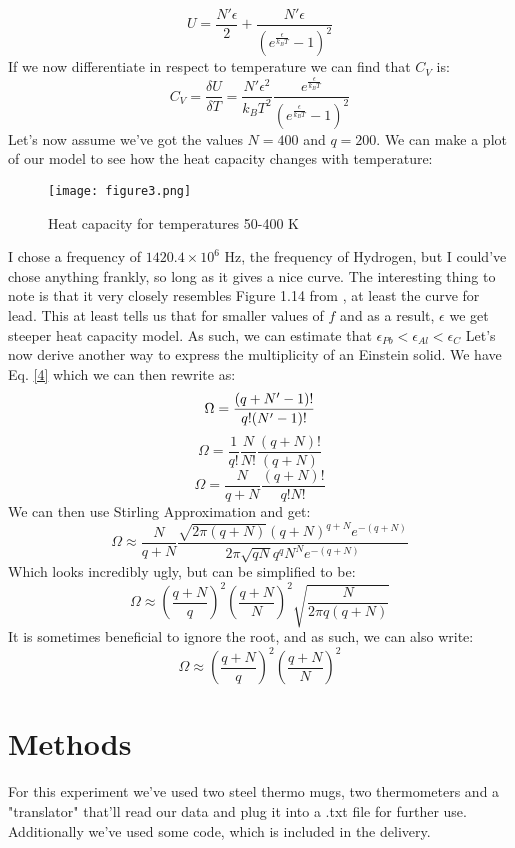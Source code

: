 \documentclass{article}
\begin{document}
\begin{equation}
    U = \frac{N' \epsilon}{2} + \frac{N' \epsilon}{(e^{\frac{\epsilon}{k_BT}}-1)^2}
\end{equation}
If we now differentiate in respect to temperature we can find that $C_V$ is:
\begin{equation}
    C_V = \frac{\delta U}{\delta T} = \frac{N' \epsilon^2}{k_BT^2} \frac{e^{\frac{\epsilon}{k_BT}}}{(e^{\frac{\epsilon}{k_BT}}-1)^2}
\end{equation}
\newpage
Let's now assume we've got the values $N = 400$ and $q = 200$. We can make a plot of our model to see how the heat capacity changes with temperature:
\begin{figure}[ht]
    \centering
    \texttt{[image: figure3.png]}
    \caption{Heat capacity for temperatures 50-400 K}
    \label{fig:3}
\end{figure}
\newline
I chose a frequency of $1420.4\times10^6$ Hz, the frequency of Hydrogen, but I could've chose anything frankly, so long as it gives a nice curve. The interesting thing to note is that it very closely resembles Figure 1.14 from \cite{schroeder_daniel_thermal_physics}, at least the curve for lead.
\newline
This at least tells us that for smaller values of $f$ and as a result, $\epsilon$ we get steeper heat capacity model. As such, we can estimate that $\epsilon_{Pb} < \epsilon_{Al} < \epsilon_{C}$
\newline
Let's now derive another way to express the multiplicity of an Einstein solid. We have Eq. \ref{4} which we can then rewrite as:
$$\Omega = \frac{(q+N'-1)!}{q!(N'-1)!} \newline$$
$$\Omega = \frac{1}{q!} \frac{N}{N!} \frac{(q+N)!}{(q+N)}$$
$$\Omega = \frac{N}{q+N} \frac{(q+N)!}{q!N!}$$
We can then use Stirling Approximation and get:
$$\Omega \approx \frac{N}{q+N} \frac{\sqrt{2\pi (q+N)} (q+N)^{q+N} e^{-(q+N)}}{2\pi \sqrt{qN}q^q N^N e^{-(q+N)}}$$
Which looks incredibly ugly, but can be simplified to be:
\begin{equation}
    \Omega \approx  (\frac{q+N}{q})^2 (\frac{q+N}{N})^2 \sqrt{\frac{N}{2\pi q(q+N)}}
\end{equation}
It is sometimes beneficial to ignore the root, and as such, we can also write:
\begin{equation}
    \Omega \approx  (\frac{q+N}{q})^2 (\frac{q+N}{N})^2
\end{equation}
\section{Methods}
For this experiment we've used two steel thermo mugs, two thermometers and a "translator" that'll read our data and plug it into a .txt file for further use. Additionally we've used some code, which is included in the delivery.
\end{document}
